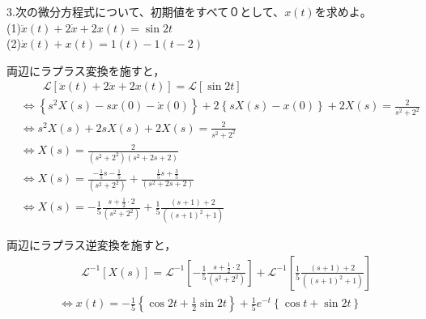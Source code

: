 \documentclass[a4paper,12pt]{article}
\begin{document}
\newpage

\noindent
3.次の微分方程式について、初期値をすべて０として、\(x(t)\)を求めよ。\\

(1)\quad \( \ddot{x}(t)+ 2\dot{x}+ 2x(t)= \sin 2t \)\\

(2)\quad \( \dot{x}(t)+ x(t)= 1(t)- 1(t-2) \)\\

\vspace{2mm}

\begin{tcolorbox}[title={3.(1) \( \ddot{x}(t)+ 2\dot{x}+ 2x(t)= \sin 2t \)
    }]
    \quad 両辺にラプラス変換を施すと，
    \vspace{-3mm}
    \begin{align*}
        &\qquad \mathcal{L}\left[ \ddot{x}(t)+ 2\dot{x}+ 2x(t) \right] 
        = \mathcal{L} \left[ \sin 2t \right] \\
        &\Leftrightarrow \left\{ s^2 X(s) - sx(0) - \dot{x}(0) \right\}
        + 2 \left\{ sX(s) - x(0) \right\}
        + 2 X(s) = \frac{2}{s^2+2^2}  \\
        &\Leftrightarrow s^2 X(s) + 2sX(s) + 2 X(s) = \frac{2}{s^2+2^2}  \\
        &\Leftrightarrow X(s) = \frac{2}{(s^2+2^2)(s^2+2s+2)}  \\
        &\Leftrightarrow X(s) = \frac{-\frac{1}{5}s-\frac{1}{5}}{(s^2+2^2)} + \frac{\frac{1}{5}s+\frac{3}{5}}{(s^2+2s+2)}\\
        &\Leftrightarrow X(s) = -\frac{1}{5} \frac{s+\frac{1}{2} \cdot 2}{(s^2+2^2)} + \frac{1}{5} \frac{(s+1)+2}{((s+1)^2+1)}
    \end{align*}
        
    \quad 両辺にラプラス逆変換を施すと，
    \vspace{-3mm}
    \begin{align*}
    &\qquad \mathcal{L}^{-1} \left[ X(s) \right] 
    = \mathcal{L}^{-1} \left[ -\frac{1}{5} \frac{s+\frac{1}{2} \cdot 2}{(s^2+2^2)}   \right] 
    + \mathcal{L}^{-1} \left[ \frac{1}{5} \frac{(s+1)+2}{((s+1)^2+1)}  \right] \\
    &\Leftrightarrow x(t) = -\frac{1}{5}\left\{ \cos 2t + \frac{1}{2} \sin 2t \right\}
    + \frac{1}{5}e^{-t}\left\{\cos t + \sin 2t\right\}
    \end{align*}
\end{tcolorbox}
\end{document}
